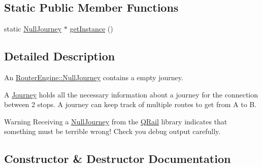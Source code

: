 \subsection*{Static Public Member Functions}
\begin{DoxyCompactItemize}
\item 
static \mbox{\hyperlink{classQRail_1_1RouterEngine_1_1NullJourney}{Null\+Journey}} $\ast$ \mbox{\hyperlink{classQRail_1_1RouterEngine_1_1NullJourney_aeb77bc5f13862ab95fd2f776f43e3661}{get\+Instance}} ()
\end{DoxyCompactItemize}


\subsection{Detailed Description}
An \mbox{\hyperlink{classQRail_1_1RouterEngine_1_1NullJourney}{Router\+Engine\+::\+Null\+Journey}} contains a empty journey. 

A \mbox{\hyperlink{classQRail_1_1RouterEngine_1_1Journey}{Journey}} holds all the necessary information about a journey for the connection between 2 stops. A journey can keep track of multiple routes to get from A to B. \begin{DoxyWarning}{Warning}
Receiving a \mbox{\hyperlink{classQRail_1_1RouterEngine_1_1NullJourney}{Null\+Journey}} from the \mbox{\hyperlink{namespaceQRail}{Q\+Rail}} library indicates that something must be terrible wrong! Check you debug output carefully. 
\end{DoxyWarning}


\subsection{Constructor \& Destructor Documentation}
\mbox{\label{classQRail_1_1RouterEngine_1_1NullJourney_a8a26b7adf10b20622fd37c113fddcaf8}} 
